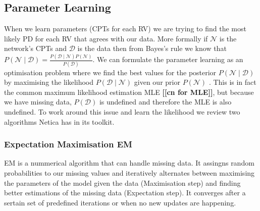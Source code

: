 \documentclass{UoYCSproject}
\begin{document}
\subsection{Parameter Learning}
\label{subsec:param_learning}
When we learn parameters (CPTs for each RV) we are trying to find the most likely PD for each RV that agrees with our data. More formally if \(\mathcal{N}\) is the network's CPTs and \(\mathcal{D}\) is the data then from Bayes's rule we know that \(P(\mathcal{N} \mid \mathcal{D}) = \frac{P(\mathcal{D} \mid \mathcal{N})P(\mathcal{N})}{P(\mathcal{D})}\). We can formulate the parameter learning as an optimisation problem where we find the best values for the posterior \(P(\mathcal{N} \mid \mathcal{D})\) by maximising the likelihood \(P(\mathcal{D} \mid \mathcal{N})\) given our prior \(P(\mathcal{N})\) \parencite[46-48]{neticaCman}. This is in fact the common maximum likelihood estimation MLE \textbf{[[cn for MLE]]}, but because we have missing data, \(P(\mathcal{D})\) is undefined and therefore the MLE is also undefined. To work around this issue and learn the likelihood we review two algorithms Netica has in its toolkit.
 

\subsubsection{Expectation Maximisation EM} %
EM \parencite{EMAlgorithm} is a nummerical algorithm that can handle missing data. It assingns random probabilities to our missing values and iteratively alternates between maximising the parameters of the model given the data (Maximisation step) and finding better estimations of the missing data (Expectation step). It converges after a sertain set of predefined iterations or when no new updates are happening. 
\end{document}
